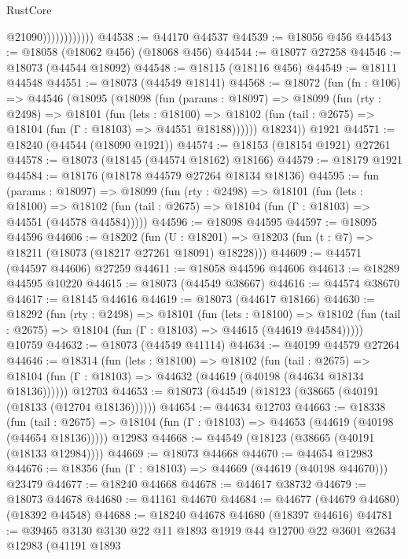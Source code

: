 \begin{lexlean}{RustCore}
\begin{coremodule}
                            @21090))))))))))))
@44538 := @44170 @44537
@44539 := @18056 @456
@44543 := @18058 (@18062 @456) (@18068 @456)
@44544 := @18077 @27258
@44546 := @18073 (@44544 @18092)
@44548 := @18115 (@18116 @456)
@44549 := @18111 @44548
@44551 := @18073 (@44549 @18141)
@44568 := @18072
    (fun (fn : @106) =>
    @44546
      (@18095
        (@18098
          (fun (params : @18097) =>
          @18099
            (fun (rty : @2498) =>
            @18101
              (fun (lets : @18100) =>
              @18102 (fun (tail : @2675) => @18104 (fun (Γ : @18103) => @44551 @18188))))))
        @18234))
    @1921
@44571 := @18240 (@44544 (@18090 @1921))
@44574 := @18153 (@18154 @1921) @27261
@44578 := @18073 (@18145 (@44574 @18162) @18166)
@44579 := @18179 @1921
@44584 := @18176 (@18178 @44579 @27264 @18134 @18136)
@44595 := fun (params : @18097) =>
  @18099
    (fun (rty : @2498) =>
    @18101
      (fun (lets : @18100) =>
      @18102 (fun (tail : @2675) => @18104 (fun (Γ : @18103) => @44551 (@44578 @44584)))))
@44596 := @18098 @44595
@44597 := @18095 @44596
@44606 := @18202
    (fun (U : @18201) => @18203 (fun (t : @7) => @18211 (@18073 (@18217 @27261 @18091) @18228)))
@44609 := @44571 (@44597 @44606) @27259
@44611 := @18058 @44596 @44606
@44613 := @18289 @44595 @10220
@44615 := @18073 (@44549 @38667)
@44616 := @44574 @38670
@44617 := @18145 @44616
@44619 := @18073 (@44617 @18166)
@44630 := @18292
    (fun (rty : @2498) =>
    @18101
      (fun (lets : @18100) =>
      @18102 (fun (tail : @2675) => @18104 (fun (Γ : @18103) => @44615 (@44619 @44584)))))
    @10759
@44632 := @18073 (@44549 @41114)
@44634 := @40199 @44579 @27264
@44646 := @18314
    (fun (lets : @18100) =>
    @18102
      (fun (tail : @2675) =>
      @18104 (fun (Γ : @18103) => @44632 (@44619 (@40198 (@44634 @18134 @18136))))))
    @12703
@44653 := @18073 (@44549 (@18123 (@38665 (@40191 (@18133 (@12704 @18136))))))
@44654 := @44634 @12703
@44663 := @18338
    (fun (tail : @2675) => @18104 (fun (Γ : @18103) => @44653 (@44619 (@40198 (@44654 @18136)))))
    @12983
@44668 := @44549 (@18123 (@38665 (@40191 (@18133 @12984))))
@44669 := @18073 @44668
@44670 := @44654 @12983
@44676 := @18356 (fun (Γ : @18103) => @44669 (@44619 (@40198 @44670))) @23479
@44677 := @18240 @44668
@44678 := @44617 @38732
@44679 := @18073 @44678
@44680 := @41161 @44670
@44684 := @44677 (@44679 @44680) (@18392 @44548)
@44688 := @18240 @44678 @44680 (@18397 @44616)
@44781 := @39465
    @3130
    @3130
    @22
    @11
    @1893
    @1919
    @44
    @12700
    @22
    @3601
    @2634
    @12983
    (@41191
      @1893

\end{coremodule}
\end{lexlean}
